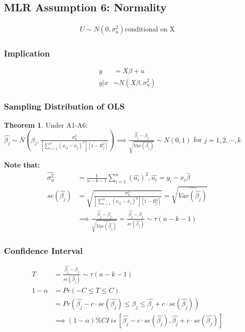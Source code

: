 \documentclass{article}
\theoremstyle{definition}
\theoremstyle{thrm}
\newtheorem{thrm}{Theorem}[section]
\theoremstyle{lma}
\theoremstyle{ppst}
\theoremstyle{crlr}
\begin{document}
\subsection{MLR Assumption 6: Normality}
\begin{align*}
	U\sim N(0,\sigma_u^2) \text{conditional on X}
\end{align*}
\subsubsection{Implication}
\begin{align*}
	y &= X\beta+u\\
	y|x &\sim N(X\beta,\sigma_u^2)
\end{align*}
\subsubsection{Sampling Distribution of OLS}
\begin{thrm}
	Under A1-A6: $\hat{\beta_j}\sim N(\beta_j,\frac{\sigma_u^2}{[\sum_{i=1}^n(x_{ij}-\bar{x}_j)^2][1-R_j^2]})\implies \frac{\hat{\beta_j}-\beta_j}{\sqrt{Var(\hat{\beta_j})}}\sim N(0,1)$ for $j = 1,2,\cdots, k$
\end{thrm}
\textbf{Note that:}
\begin{align*}
	\hat{\sigma_u^2} &=\frac{1}{n-k-1}\sum_{i=1}^n(\hat{u_i})^2, \hat{u_i} = y_i-x_i\hat{\beta}\\
	se(\hat{\beta_j}) &= \sqrt{\frac{\sigma_u^2}{[\sum_{i=1}^n(x_{ij}-\bar{x}_j)^2][1-R_j^2]}} = \sqrt{\widehat{Var(\hat{\beta_j})}}\\
	&\implies \frac{\hat{\beta_j}-\beta_j}{\sqrt{\widehat{Var(\hat{\beta_j})}}} = \frac{\hat{\beta_j}-\beta_j}{se(\hat{\beta_j})}\sim \tau(n-k-1)
\end{align*}
\subsubsection{Confidence Interval}
\begin{align*}
	T &= \frac{\hat{\beta_j}-\beta_j}{se(\hat{\beta_j})}\sim \tau(n-k-1)\\
	1-\alpha &= Pr(-C\leq T\leq C)\\
	&= Pr(\hat{\beta_j}-c\cdot se(\hat{\beta_j}) \leq \beta_j \leq \hat{\beta_j}+c\cdot se(\hat{\beta_j}))\\
	&\implies (1-\alpha)\% CI \ is \ [\hat{\beta_j}-c\cdot se(\hat{\beta_j}),\hat{\beta_j}+c\cdot se(\hat{\beta_j})]
\end{align*}
\end{document}
